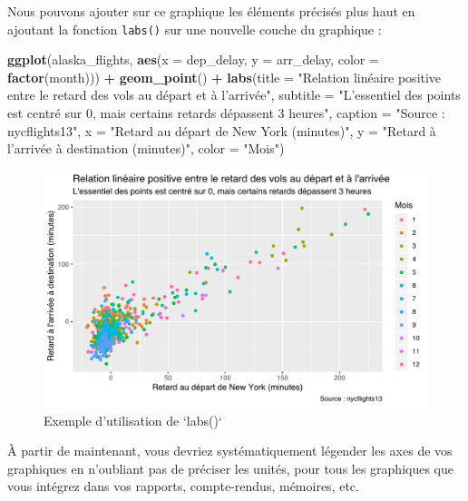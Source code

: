 \documentclass[a4paperpaper,]{article}
\newenvironment{Shaded}{\begin{snugshade}}{\end{snugshade}}
\newcommand{\KeywordTok}[1]{\textcolor[rgb]{0.13,0.29,0.53}{\textbf{#1}}}
\newcommand{\DataTypeTok}[1]{\textcolor[rgb]{0.13,0.29,0.53}{#1}}
\newcommand{\StringTok}[1]{\textcolor[rgb]{0.31,0.60,0.02}{#1}}
\newcommand{\OperatorTok}[1]{\textcolor[rgb]{0.81,0.36,0.00}{\textbf{#1}}}
\newcommand{\NormalTok}[1]{#1}
\theoremstyle{definition}
\theoremstyle{definition}
\theoremstyle{definition}
\theoremstyle{remark}
\begin{document}
Nous pouvons ajouter sur ce graphique les éléments précisés plus haut en
ajoutant la fonction \texttt{labs()} sur une nouvelle couche du
graphique :

\begin{Shaded}
\begin{Highlighting}[]
\KeywordTok{ggplot}\NormalTok{(alaska_flights, }\KeywordTok{aes}\NormalTok{(}\DataTypeTok{x =}\NormalTok{ dep_delay, }\DataTypeTok{y =}\NormalTok{ arr_delay, }\DataTypeTok{color =} \KeywordTok{factor}\NormalTok{(month))) }\OperatorTok{+}
\StringTok{  }\KeywordTok{geom_point}\NormalTok{() }\OperatorTok{+}
\StringTok{  }\KeywordTok{labs}\NormalTok{(}\DataTypeTok{title =} \StringTok{"Relation linéaire positive entre le retard des vols au départ et à l'arrivée"}\NormalTok{,}
       \DataTypeTok{subtitle =} \StringTok{"L'essentiel des points est centré sur 0, mais certains retards dépassent 3 heures"}\NormalTok{,}
       \DataTypeTok{caption =} \StringTok{"Source : nycflights13"}\NormalTok{,}
       \DataTypeTok{x =} \StringTok{"Retard au départ de New York (minutes)"}\NormalTok{,}
       \DataTypeTok{y =} \StringTok{"Retard à l'arrivée à destination (minutes)"}\NormalTok{,}
       \DataTypeTok{color =} \StringTok{"Mois"}\NormalTok{)}
\end{Highlighting}
\end{Shaded}

\begin{figure}[htpb]

{\centering \includegraphics[width=0.9\linewidth]{figure/varcolorlabel2-1} 

}

\caption{Exemple d'utilisation de `labs()`}\label{fig:varcolorlabel2}
\end{figure}

À partir de maintenant, vous devriez systématiquement légender les axes
de vos graphiques en n'oubliant pas de préciser les unités, pour tous
les graphiques que vous intégrez dans vos rapports, compte-rendus,
mémoires, etc.
\end{document}
